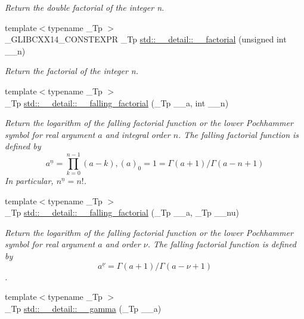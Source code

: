 \begin{DoxyCompactItemize}
\begin{DoxyCompactList}\small\item\em Return the double factorial of the integer n. \end{DoxyCompactList}\item 
{\footnotesize template$<$typename \+\_\+\+Tp $>$ }\\\+\_\+\+G\+L\+I\+B\+C\+X\+X14\+\_\+\+C\+O\+N\+S\+T\+E\+X\+PR \+\_\+\+Tp \hyperlink{namespacestd_1_1____detail_a8de5d6069cbef126684be0800f47f8b2}{std\+::\+\_\+\+\_\+detail\+::\+\_\+\+\_\+factorial} (unsigned int \+\_\+\+\_\+n)
\begin{DoxyCompactList}\small\item\em Return the factorial of the integer n. \end{DoxyCompactList}\item 
{\footnotesize template$<$typename \+\_\+\+Tp $>$ }\\\+\_\+\+Tp \hyperlink{namespacestd_1_1____detail_a62ddf0f8d9467f4c3f2cc0b500ca1272}{std\+::\+\_\+\+\_\+detail\+::\+\_\+\+\_\+falling\+\_\+factorial} (\+\_\+\+Tp \+\_\+\+\_\+a, int \+\_\+\+\_\+n)
\begin{DoxyCompactList}\small\item\em Return the logarithm of the falling factorial function or the lower Pochhammer symbol for real argument $ a $ and integral order $ n $. The falling factorial function is defined by \[ a^{\underline{n}} = \prod_{k=0}^{n-1} (a - k), (a)_0 = 1 = \Gamma(a + 1) / \Gamma(a - n + 1) \] In particular, $ n^{\underline{n}} = n! $. \end{DoxyCompactList}\item 
{\footnotesize template$<$typename \+\_\+\+Tp $>$ }\\\+\_\+\+Tp \hyperlink{namespacestd_1_1____detail_a7cde2bf518e7ea3a0db2bec8f41b6465}{std\+::\+\_\+\+\_\+detail\+::\+\_\+\+\_\+falling\+\_\+factorial} (\+\_\+\+Tp \+\_\+\+\_\+a, \+\_\+\+Tp \+\_\+\+\_\+nu)
\begin{DoxyCompactList}\small\item\em Return the logarithm of the falling factorial function or the lower Pochhammer symbol for real argument $ a $ and order $ \nu $. The falling factorial function is defined by \[ a^{\underline{\nu}} = \Gamma(a + 1) / \Gamma(a - \nu + 1) \]. \end{DoxyCompactList}\item 
{\footnotesize template$<$typename \+\_\+\+Tp $>$ }\\\+\_\+\+Tp \hyperlink{namespacestd_1_1____detail_a178e0b2cc0ae66b7d958e837da4fe4c1}{std\+::\+\_\+\+\_\+detail\+::\+\_\+\+\_\+gamma} (\+\_\+\+Tp \+\_\+\+\_\+a)

\end{DoxyCompactItemize}
